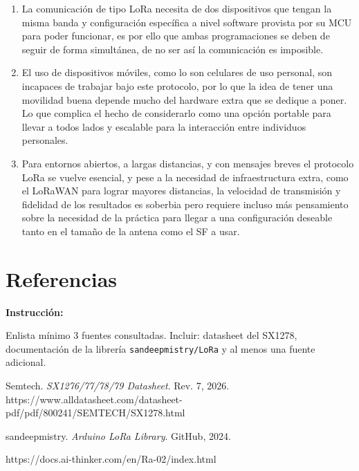 \documentclass[11pt, letterpaper]{article}
\newenvironment{instruccion}{%
  \begin{mdframed}[backgroundcolor=tealLight, linecolor=tealMain, linewidth=1pt,
    innerleftmargin=10pt, innerrightmargin=10pt,
    innertopmargin=6pt,  innerbottommargin=6pt]
  \small\textbf{\color{tealMain}Instrucci\'on:}\hspace{4pt}
}{\end{mdframed}}
\begin{document}
\begin{enumerate}[leftmargin=1.5cm, itemsep=0.5cm]

  \item La comunicaci\'on de tipo LoRa necesita de dos dispositivos que tengan la misma banda y configuraci\'on específica a nivel software provista por su MCU para poder funcionar, es por ello que ambas programaciones se deben de seguir de forma simultánea, de no ser as\'i la comunicaci\'on es imposible.

  \item El uso de dispositivos m\'oviles, como lo son celulares de uso personal, son incapaces de trabajar bajo este protocolo, por lo que la idea de tener una movilidad buena depende mucho del hardware extra que se dedique a poner. Lo que complica el hecho de considerarlo como una opci\'on portable para llevar a todos lados y escalable para la interacci\'on entre individuos personales.

  \item Para entornos abiertos, a largas distancias, y con mensajes breves el protocolo LoRa se vuelve esencial, y pese a la necesidad de infraestructura extra, como el LoRaWAN para lograr mayores distancias, la velocidad de transmisión y fidelidad de los resultados es soberbia pero requiere incluso m\'as pensamiento sobre la necesidad de la pr\'actica para llegar a una configuraci\'on deseable tanto en el tamaño de la antena como el SF a usar.

\end{enumerate}

\section*{Referencias}

\begin{instruccion}
  Enlista m\'inimo 3 fuentes consultadas. Incluir: datasheet del SX1278,
  documentaci\'on de la librer\'ia \texttt{sandeepmistry/LoRa} y al menos
  una fuente adicional.
\end{instruccion}

\begin{enumerate}[leftmargin=1.5cm, label={[\arabic*]}]
  \item Semtech. \textit{SX1276/77/78/79 Datasheet}. Rev. 7, 2026. https://www.alldatasheet.com/datasheet-pdf/pdf/800241/SEMTECH/SX1278.html
  \item sandeepmistry. \textit{Arduino LoRa Library}. GitHub, 2024.
  \item https://docs.ai-thinker.com/en/Ra-02/index.html
\end{enumerate}
\end{document}
